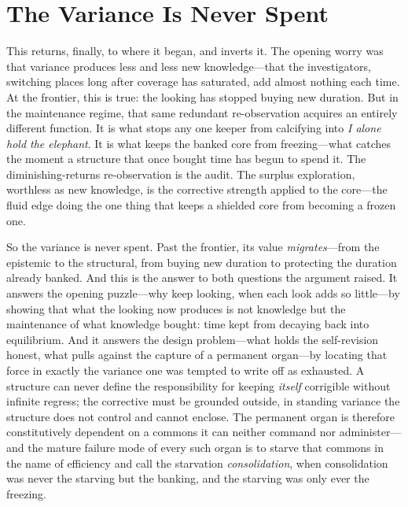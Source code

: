 \documentclass{article}
\begin{document}
\section*{The Variance Is Never Spent}

This returns, finally, to where it began, and inverts it. The opening worry was that variance produces less and less new knowledge---that the investigators, switching places long after coverage has saturated, add almost nothing each time. At the frontier, this is true: the looking has stopped buying new duration. But in the maintenance regime, that same redundant re-observation acquires an entirely different function. It is what stops any one keeper from calcifying into \textit{I alone hold the elephant}. It is what keeps the banked core from freezing---what catches the moment a structure that once bought time has begun to spend it. The diminishing-returns re-observation is the audit. The surplus exploration, worthless as new knowledge, is the corrective strength applied to the core---the fluid edge doing the one thing that keeps a shielded core from becoming a frozen one.

So the variance is never spent. Past the frontier, its value \textit{migrates}---from the epistemic to the structural, from buying new duration to protecting the duration already banked. And this is the answer to both questions the argument raised. It answers the opening puzzle---why keep looking, when each look adds so little---by showing that what the looking now produces is not knowledge but the maintenance of what knowledge bought: time kept from decaying back into equilibrium. And it answers the design problem---what holds the self-revision honest, what pulls against the capture of a permanent organ---by locating that force in exactly the variance one was tempted to write off as exhausted. A structure can never define the responsibility for keeping \textit{itself} corrigible without infinite regress; the corrective must be grounded outside, in standing variance the structure does not control and cannot enclose. The permanent organ is therefore constitutively dependent on a commons it can neither command nor administer---and the mature failure mode of every such organ is to starve that commons in the name of efficiency and call the starvation \textit{consolidation}, when consolidation was never the starving but the banking, and the starving was only ever the freezing.
\end{document}
